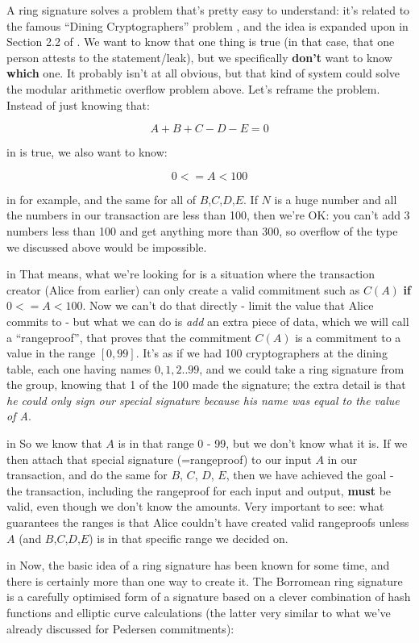 \documentclass[10pt,a4paper]{article}
\begin{document}
A ring signature solves a problem that's pretty easy to understand: it's related to the famous ``Dining Cryptographers'' problem \cite{chaum_dc}, and the idea is expanded upon in Section 2.2 of \cite{ms_ringsig}. We want to know that one thing is true (in that case, that one person attests to the statement/leak), but we specifically \textbf{don't} want to know \textbf{which} one. It probably isn't at all obvious, but that kind of system could solve the modular arithmetic overflow problem above. Let's reframe the problem. Instead of just knowing that:

\[A + B + C - D -E = 0\]

 in \noindent is true, we also want to know:

\[0 <= A < 100\]

 in \noindent for example, and the same for all of $B$,$C$,$D$,$E$. If $N$ is a huge number and all the numbers in our transaction are less than 100, then we're OK: you can't add 3 numbers less than 100 and get anything more than 300, so overflow of the type we discussed above would be impossible.

 in \noindent That means, what we're looking for is a situation where the transaction creator (Alice from earlier) can only create a valid commitment such as $C(A)$ \textbf{if} $0 <= A < 100$. Now we can't do that directly - limit the value that Alice commits to - but what we can do is \textit{add} an extra piece of data, which we will call a ``rangeproof'', that proves that the commitment $C(A)$ is a commitment to a value in the range $[0,99]$. It's as if we had 100 cryptographers at the dining table, each one having names $0,1,2..99$, and we could take a ring signature from the group, knowing that 1 of the 100 made the signature; the extra detail is that \textit{he could only sign our special signature because his name was equal to the value of A}.

 in \noindent So we know that $A$ is in that range 0 - 99, but we don't know what it is. If we then attach that special signature (=rangeproof) to our input $A$ in our transaction, and do the same for $B$, $C$, $D$, $E$, then we have achieved the goal - the transaction, including the rangeproof for each input and output, \textbf{must} be valid, even though we don't know the amounts. Very important to see: what guarantees the ranges is that Alice couldn't have created valid rangeproofs unless $A$ (and $B$,$C$,$D$,$E$) is in that specific range we decided on.

 in \noindent Now, the basic idea of a ring signature has been known for some time, and there is certainly more than one way to create it. The Borromean ring signature \cite{borromean} is a carefully optimised form of a signature based on a clever combination of hash functions and elliptic curve calculations (the latter very similar to what we've already discussed for Pedersen commitments):
\end{document}
